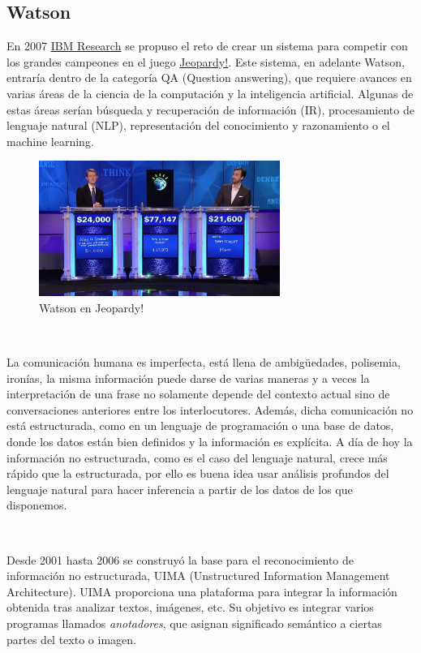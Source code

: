 \documentclass[paper=a4, fontsize=10pt]{scrartcl} %
\numberwithin{equation}{section} %
\numberwithin{figure}{section} %
\numberwithin{table}{section} %
\begin{document}
\subsection{Watson}
En 2007 \href{https://www.research.ibm.com/}{IBM Research} se propuso el reto de crear un sistema para competir con los grandes campeones en el juego \href{https://www.jeopardy.com/}{Jeopardy!}. 
Este sistema, en adelante Watson, entraría dentro de la categoría QA (Question answering), que requiere avances en varias áreas de la ciencia de la computación y la inteligencia artificial. 
Algunas de estas áreas serían búsqueda y recuperación de información (IR), procesamiento de lenguaje natural (NLP), representación del conocimiento y razonamiento o el machine learning.

\begin{figure}[H]
	\centering
	\label{j-watson}
	\includegraphics[width=0.7\textwidth]{./Imagenes/j-watson.jpg}
	\caption{Watson en Jeopardy!}
\end{figure}

\

La comunicación humana es imperfecta, está llena de ambigüedades, polisemia, ironías, la misma información puede darse de varias maneras y a veces la interpretación de una frase no solamente depende del contexto actual sino de conversaciones anteriores entre los interlocutores.
Además, dicha comunicación no está estructurada, como en un lenguaje de programación o una base de datos, donde los datos están bien definidos y la información es explícita.
A día de hoy la información no estructurada, como es el caso del lenguaje natural, crece más rápido que la estructurada, por ello es buena idea usar análisis profundos del lenguaje natural para hacer inferencia a partir de los datos de los que disponemos.

\

Desde 2001 hasta 2006 se construyó la base para el reconocimiento de información no estructurada, UIMA (Unstructured
Information Management Architecture). %
UIMA proporciona una plataforma para integrar la información obtenida tras analizar textos, imágenes, etc.
Su objetivo es integrar varios programas llamados \textit{anotadores}, que asignan significado semántico a ciertas partes del texto o imagen.
\end{document}

